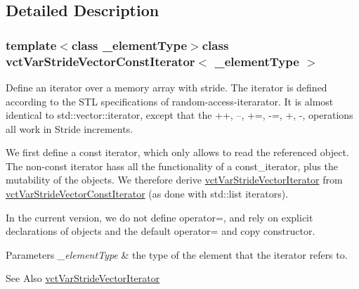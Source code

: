 \subsection{Detailed Description}
\subsubsection*{template$<$class \-\_\-element\-Type$>$class vct\-Var\-Stride\-Vector\-Const\-Iterator$<$ \-\_\-element\-Type $>$}

Define an iterator over a memory array with stride. The iterator is defined according to the S\-T\-L specifications of random-\/access-\/iterarator. It is almost identical to std\-::vector\-::iterator, except that the ++, --, +=, -\/=, +, -\/, operations all work in Stride increments.

We first define a const iterator, which only allows to read the referenced object. The non-\/const iterator hass all the functionality of a const\-\_\-iterator, plus the mutability of the objects. We therefore derive \hyperlink{classvct_var_stride_vector_iterator}{vct\-Var\-Stride\-Vector\-Iterator} from \hyperlink{classvct_var_stride_vector_const_iterator}{vct\-Var\-Stride\-Vector\-Const\-Iterator} (as done with std\-::list iterators).

In the current version, we do not define operator=, and rely on explicit declarations of objects and the default operator= and copy constructor.


\begin{DoxyParams}{Parameters}
{\em \-\_\-element\-Type} & the type of the element that the iterator refers to.\\
\hline
\end{DoxyParams}
\begin{DoxySeeAlso}{See Also}
\hyperlink{classvct_var_stride_vector_iterator}{vct\-Var\-Stride\-Vector\-Iterator} 
\end{DoxySeeAlso}


